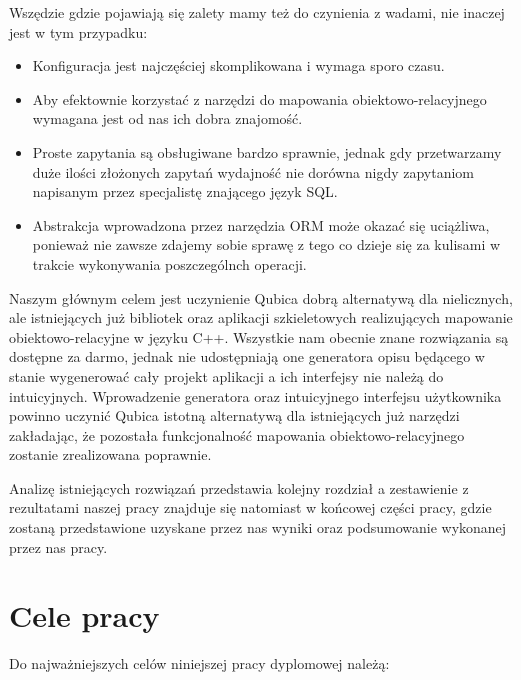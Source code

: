 \documentclass[12pt]{report}
\begin{document}
Wszędzie gdzie pojawiają się zalety mamy też do czynienia z wadami, nie inaczej jest w tym przypadku:

\begin{itemize}
\item Konfiguracja jest najczęściej skomplikowana i wymaga sporo czasu.
\item Aby efektownie korzystać z narzędzi do mapowania obiektowo-relacyjnego wymagana jest od nas ich dobra znajomość.
\item Proste zapytania są obsługiwane bardzo sprawnie, jednak gdy przetwarzamy duże ilości złożonych zapytań wydajność nie dorówna nigdy zapytaniom na\-pi\-sa\-nym
przez specjalistę znającego język SQL.
\item Abstrakcja wprowadzona przez narzędzia ORM może okazać się uciążliwa, ponieważ nie zawsze zdajemy sobie sprawę z tego co dzieje się za kulisami w trakcie
wykonywania poszczególnch operacji.
\end{itemize}

Naszym głównym celem jest uczynienie Qubica dobrą alternatywą dla nie\-li\-cznych, ale istniejących już bibliotek oraz aplikacji szkieletowych realizujących mapowanie 
obiektowo-relacyjne w języku C++. Wszystkie nam obecnie znane rozwiązania są dostępne za darmo, jednak nie udostępniają one generatora opisu będącego w stanie 
wygenerować cały projekt aplikacji a ich interfejsy nie należą do intuicyjnych. Wprowadzenie generatora oraz intuicyjnego interfejsu użytkownika powinno uczynić Qubica
istotną alternatywą dla istniejących już narzędzi za\-kła\-da\-jąc, że pozostała funkcjonalność mapowania obiektowo-relacyjnego zostanie zre\-al\-iz\-owana poprawnie.

Analizę istniejących rozwiązań przedstawia kolejny rozdział a zestawienie z rezultatami naszej pracy znajduje się natomiast w końcowej części pracy, gdzie zostaną
przedstawione uzyskane przez nas wyniki oraz podsumowanie wykonanej przez nas pracy.

\section{Cele pracy} %

Do najważniejszych celów niniejszej pracy dyplomowej należą:
\end{document}
